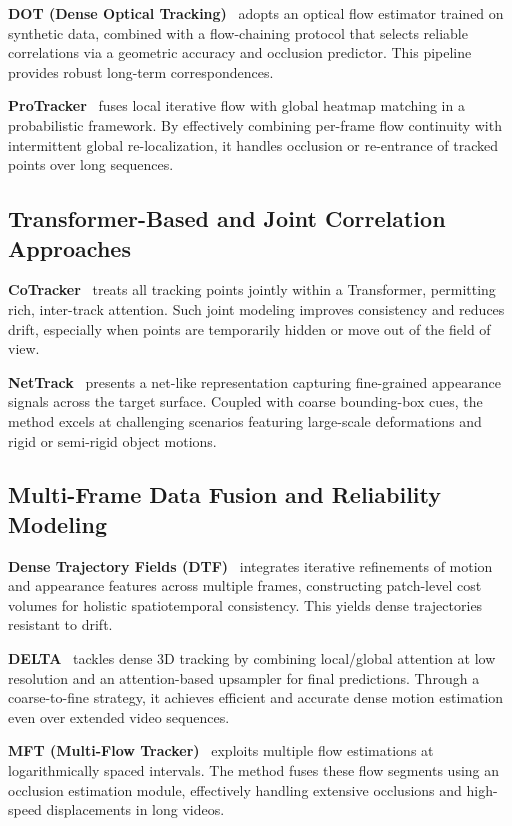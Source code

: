 \documentclass[11pt]{article}
\begin{document}
\textbf{DOT (Dense Optical Tracking)}~\cite{le2024dense} adopts an optical flow estimator trained on synthetic data, combined with a flow-chaining protocol that selects reliable correlations via a geometric accuracy and occlusion predictor. This pipeline provides robust long-term correspondences.

\textbf{ProTracker}~\cite{zhang2025protracker} fuses local iterative flow with global heatmap matching in a probabilistic framework. By effectively combining per-frame flow continuity with intermittent global re-localization, it handles occlusion or re-entrance of tracked points over long sequences.

\subsection{Transformer-Based and Joint Correlation Approaches}
\textbf{CoTracker}~\cite{karaev2024cotracker} treats all tracking points jointly within a Transformer, permitting rich, inter-track attention. Such joint modeling improves consistency and reduces drift, especially when points are temporarily hidden or move out of the field of view.

\textbf{NetTrack}~\cite{zheng2024nettrack} presents a net-like representation capturing fine-grained appearance signals across the target surface. Coupled with coarse bounding-box cues, the method excels at challenging scenarios featuring large-scale deformations and rigid or semi-rigid object motions.

\subsection{Multi-Frame Data Fusion and Reliability Modeling}
\textbf{Dense Trajectory Fields (DTF)}~\cite{tournadre2024dense} integrates iterative refinements of motion and appearance features across multiple frames, constructing patch-level cost volumes for holistic spatiotemporal consistency. This yields dense trajectories resistant to drift.

\textbf{DELTA}~\cite{ngo2024delta} tackles dense 3D tracking by combining local/global attention at low resolution and an attention-based upsampler for final predictions. Through a coarse-to-fine strategy, it achieves efficient and accurate dense motion estimation even over extended video sequences.

\textbf{MFT (Multi-Flow Tracker)}~\cite{neoral2024mft} exploits multiple flow estimations at logarithmically spaced intervals. The method fuses these flow segments using an occlusion estimation module, effectively handling extensive occlusions and high-speed displacements in long videos.
\end{document}
